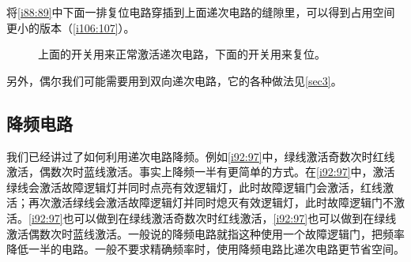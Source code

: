 将\autoref{i88:89}中下面一排复位电路穿插到上面递次电路的缝隙里，可以得到占用空间更小的版本（\autoref{i106:107}）。

\begin{figure}[!h]
\begin{center}
\end{center}
\caption{上面的开关用来正常激活递次电路，下面的开关用来复位。}
\label{i106:107}
\end{figure}

另外，偶尔我们可能需要用到双向递次电路，它的各种做法见\autoref{sec3}。

\subsection{降频电路}\label{sec2:1}

我们已经讲过了如何利用递次电路降频。例如\autoref{i92:97}中，绿线激活奇数次时红线激活，偶数次时蓝线激活。事实上降频一半有更简单的方式。在\autoref{i92:97}中，激活绿线会激活故障逻辑灯并同时点亮有效逻辑灯，此时故障逻辑门会激活，红线激活；再次激活绿线会激活故障逻辑灯并同时熄灭有效逻辑灯，此时故障逻辑门不激活。\autoref{i92:97}也可以做到在绿线激活奇数次时红线激活，\autoref{i92:97}也可以做到在绿线激活偶数次时蓝线激活。一般说的降频电路就指这种使用一个故障逻辑门，把频率降低一半的电路。一般不要求精确频率时，使用降频电路比递次电路更节省空间。

